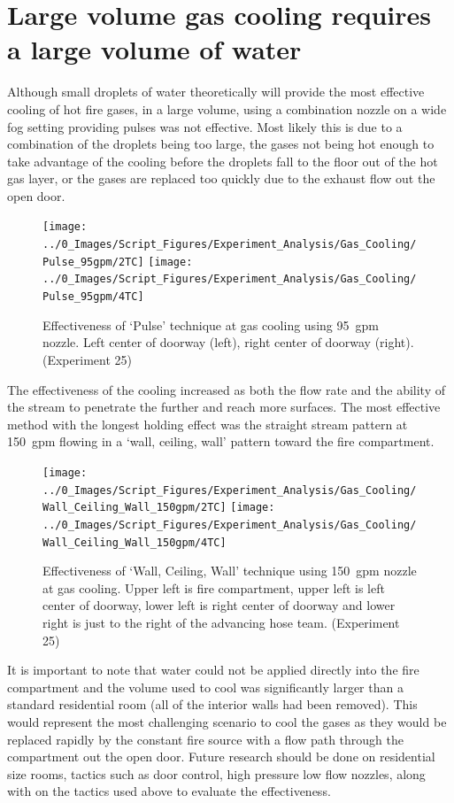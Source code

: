 \documentclass[12pt,oneside]{book}
\begin{document}
\section{Large volume gas cooling requires a large volume of water} \label{tc:large_volume_gas_cooling}
Although small droplets of water theoretically will provide the most effective cooling of hot fire gases, in a large volume, using a combination nozzle on a wide fog setting providing pulses was not effective. Most likely this is due to a combination of the droplets being too large, the gases not being hot enough to take advantage of the cooling before the droplets fall to the floor out of the hot gas layer, or the gases are replaced too quickly due to the exhaust flow out the open door.

\begin{figure}[H]
\centering
\texttt{[image: ../0\_Images/Script\_Figures/Experiment\_Analysis/Gas\_Cooling/Pulse\_95gpm/2TC]}
\texttt{[image: ../0\_Images/Script\_Figures/Experiment\_Analysis/Gas\_Cooling/Pulse\_95gpm/4TC]}
\caption[Gas Cooling Example - Pulse 95~gpm Setting]{Effectiveness of `Pulse' technique at gas cooling using 95~gpm nozzle. Left center of doorway (left), right center of doorway (right). (Experiment 25)}
\label{fig:gas_pulse_95_TC}
\end{figure}

The effectiveness of the cooling increased as both the flow rate and the ability of the stream to penetrate the further and reach more surfaces. The most effective method with the longest holding effect was the straight stream pattern at 150~gpm flowing in a `wall, ceiling, wall' pattern toward the fire compartment. 

 \begin{figure}[H]
\centering
\texttt{[image: ../0\_Images/Script\_Figures/Experiment\_Analysis/Gas\_Cooling/Wall\_Ceiling\_Wall\_150gpm/2TC]}
\texttt{[image: ../0\_Images/Script\_Figures/Experiment\_Analysis/Gas\_Cooling/Wall\_Ceiling\_Wall\_150gpm/4TC]}
\caption[Gas Cooling - Straight Stream 150~gpm]{Effectiveness of `Wall, Ceiling, Wall' technique using 150~gpm nozzle at gas cooling. Upper left is fire compartment, upper left is left center of doorway, lower left is right center of doorway and lower right is just to the right of the advancing hose team. (Experiment 25)}
\label{fig:gas_wall_ceiling_wall_150_TC}
\end{figure}

It is important to note that water could not be applied directly into the fire compartment and the volume used to cool was significantly larger than a standard residential room (all of the interior walls had been removed). This would represent the most challenging scenario to cool the gases as they would be replaced rapidly by the constant fire source with a flow path through the compartment out the open door. Future research should be done on residential size rooms, tactics such as door control, high pressure low flow nozzles, along with on the tactics used above to evaluate the effectiveness.  
\end{document}
